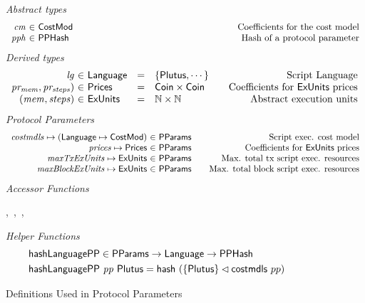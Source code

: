 \begin{figure*}[htb]
  \emph{Abstract types}
  \begin{equation*}
    \begin{array}{r@{~\in~}l@{\qquad\qquad\qquad\qquad\qquad\qquad\qquad\qquad\qquad}r}
      \var{cm} & \CostMod & \text{Coefficients for the cost model} \\
      \var{pph} & \PPHash & \text{Hash of a protocol parameter}
    \end{array}
  \end{equation*}
  \emph{Derived types}
  \begin{equation*}
    \begin{array}{r@{~\in~}l@{\quad=\quad}l@{\qquad}r}
      \var{lg}
      & \Language
      & \{\Plutus, \dotsb\}
      & \text{Script Language}
      \\
      \var{pr_{mem}, pr_{steps})}
      & \Prices
      & \Coin \times \Coin
      & \text {Coefficients for $\ExUnits$ prices}
      \\
      \var{(mem, steps)}
      & \ExUnits
      & \N \times \N
      & \text{Abstract execution units} \\
    \end{array}
  \end{equation*}
  \emph{Protocol Parameters}
  \begin{equation*}
      \begin{array}{r@{~\in~}l@{\qquad}r}
        \var{costmdls} \mapsto (\Language \mapsto \CostMod) & \PParams & \text{Script exec. cost model}\\
        \var{prices} \mapsto \Prices & \PParams & \text{Coefficients for $\ExUnits$ prices} \\
        \var{maxTxExUnits} \mapsto \ExUnits & \PParams & \text{Max. total tx script exec. resources}\\
        \var{maxBlockExUnits} \mapsto \ExUnits & \PParams & \text{Max. total block script exec. resources}\\
      \end{array}
  \end{equation*}
  \emph{Accessor Functions}
  \begin{center}
  ,~,~,~
  \end{center}
  \emph{Helper Functions}
  \begin{align*}
    & \mathsf{hashLanguagePP} \in \mathsf{PParams} \to \mathsf{Language} \to \mathsf{PPHash} \\
    & \mathsf{hashLanguagePP}~\mathit{pp}~\mathsf{Plutus} = \mathsf{hash}~(\{\mathsf{Plutus}\} \lhd \mathsf{costmdls}~{pp})
  \end{align*}
  \caption{Definitions Used in Protocol Parameters}
  \label{fig:defs:protocol-parameters}
\end{figure*}

